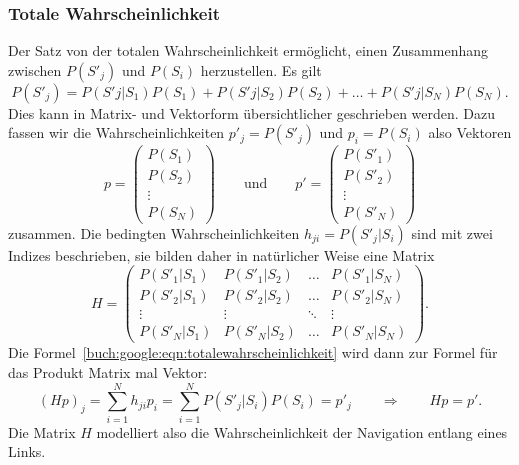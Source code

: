 \subsubsection{Totale Wahrscheinlichkeit}
Der Satz von der totalen Wahrscheinlichkeit ermöglicht, einen Zusammenhang
%
%
zwischen $P(S'_j)$ und $P(S_i)$ herzustellen.
Es gilt
\begin{equation}
P(S'_j)
=
P(S'j|S_1) P(S_1)
+
P(S'j|S_2) P(S_2)
+
\dots
+
P(S'j|S_N) P(S_N).
\label{buch:google:eqn:totalewahrscheinlichkeit}
\end{equation}
Dies kann in Matrix- und Vektorform übersichtlicher geschrieben werden.
Dazu fassen wir die Wahrscheinlichkeiten $p'_j=P(S'_j)$ und $p_i=P(S_i)$
also Vektoren
\[
p
=
\begin{pmatrix}
P(S_1)\\
P(S_2)\\
\vdots\\
P(S_N)
\end{pmatrix}
\qquad
\text{und}
\qquad
p'
=
\begin{pmatrix}
P(S'_1)\\
P(S'_2)\\
\vdots\\
P(S'_N)
\end{pmatrix}
\]
zusammen.
Die bedingten Wahrscheinlichkeiten $h_{ji}=P(S'_j|S_i)$ sind mit zwei Indizes
beschrieben, sie bilden daher in natürlicher Weise eine Matrix
\[
H
=
\begin{pmatrix}
P(S'_1|S_1)&P(S'_1|S_2)&\dots &P(S'_1|S_N)\\
P(S'_2|S_1)&P(S'_2|S_2)&\dots &P(S'_2|S_N)\\
\vdots     &\vdots     &\ddots&\vdots     \\
P(S'_N|S_1)&P(S'_N|S_2)&\dots &P(S'_N|S_N)
\end{pmatrix}.
\]
Die Formel~\eqref{buch:google:eqn:totalewahrscheinlichkeit} wird dann zur
Formel für das Produkt Matrix mal Vektor:
\[
(Hp)_j
=
\sum_{i=1}^N h_{ji} p_i
=
\sum_{i=1}^N P(S'_j|S_i) P(S_i)
=
p'_j
\qquad\Rightarrow\qquad
Hp=p'.
\]
Die Matrix $H$ modelliert also die Wahrscheinlichkeit der Navigation
entlang eines Links.

